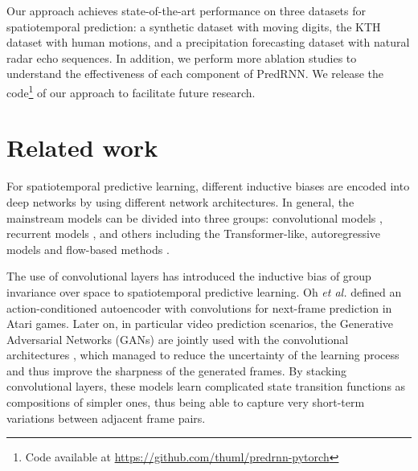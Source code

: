 \documentclass[10pt,journal,compsoc]{IEEEtran}
\begin{document}
Our approach achieves state-of-the-art performance on three datasets for spatiotemporal prediction: a synthetic dataset with moving digits, the KTH dataset with human motions, and a precipitation forecasting dataset with natural radar echo sequences. 
In addition, we perform more ablation studies to understand the effectiveness of each component of PredRNN.
We release the code\footnote{Code available at \url{https://github.com/thuml/predrnn-pytorch}} of our approach to facilitate future research.


\section{Related work}

For spatiotemporal predictive learning, different inductive biases are encoded into deep networks by using different network architectures. 
In general, the mainstream models can be divided into three groups: convolutional models \cite{Oh2015Action,Mathieu2015Deep,tulyakov2018mocogan}, recurrent models \cite{srivastava2015unsupervised,shi2015convolutional,babaeizadeh2017stochastic}, and others including the Transformer-like, autoregressive models and flow-based methods \cite{weissenborn2019scaling,kumar2019videoflow}.





The use of convolutional layers has introduced the inductive bias of group invariance over space to spatiotemporal predictive learning.
Oh \textit{et al.} \cite{Oh2015Action} defined an action-conditioned autoencoder with convolutions for next-frame prediction in Atari games. 
Later on, in particular video prediction scenarios, the Generative Adversarial Networks (GANs) \cite{Goodfellow2014Generative,Denton2015Deep} are jointly used with the convolutional architectures \cite{Mathieu2015Deep,bhattacharjee2017temporal,liang2017dual,tulyakov2018mocogan,wu2020future}, which managed to reduce the uncertainty of the learning process and thus improve the sharpness of the generated frames.
By stacking convolutional layers, these models learn complicated state transition functions as compositions of simpler ones, thus being able to capture very short-term variations between adjacent frame pairs.
\end{document}

